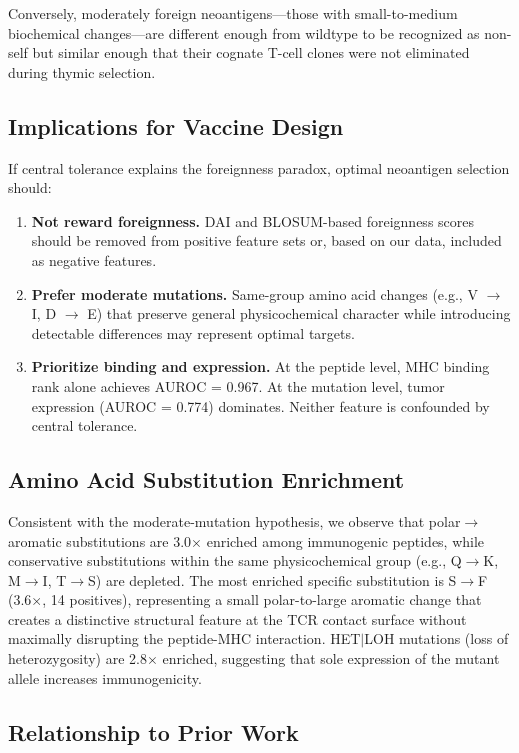 \documentclass[11pt,twocolumn]{article}
\begin{document}
Conversely, moderately foreign neoantigens---those with small-to-medium biochemical changes---are different enough from wildtype to be recognized as non-self but similar enough that their cognate T-cell clones were not eliminated during thymic selection.

\subsection{Implications for Vaccine Design}

If central tolerance explains the foreignness paradox, optimal neoantigen selection should:

\begin{enumerate}[leftmargin=*,topsep=0pt,itemsep=2pt]
\item \textbf{Not reward foreignness.} DAI and BLOSUM-based foreignness scores should be removed from positive feature sets or, based on our data, included as negative features.
\item \textbf{Prefer moderate mutations.} Same-group amino acid changes (e.g., V $\to$ I, D $\to$ E) that preserve general physicochemical character while introducing detectable differences may represent optimal targets.
\item \textbf{Prioritize binding and expression.} At the peptide level, MHC binding rank alone achieves AUROC = 0.967. At the mutation level, tumor expression (AUROC = 0.774) dominates. Neither feature is confounded by central tolerance.
\end{enumerate}

\subsection{Amino Acid Substitution Enrichment}

Consistent with the moderate-mutation hypothesis, we observe that polar$\to$aromatic substitutions are 3.0$\times$ enriched among immunogenic peptides, while conservative substitutions within the same physicochemical group (e.g., Q$\to$K, M$\to$I, T$\to$S) are depleted. The most enriched specific substitution is S$\to$F (3.6$\times$, 14 positives), representing a small polar-to-large aromatic change that creates a distinctive structural feature at the TCR contact surface without maximally disrupting the peptide-MHC interaction. HET$|$LOH mutations (loss of heterozygosity) are 2.8$\times$ enriched, suggesting that sole expression of the mutant allele increases immunogenicity.

\subsection{Relationship to Prior Work}
\end{document}
